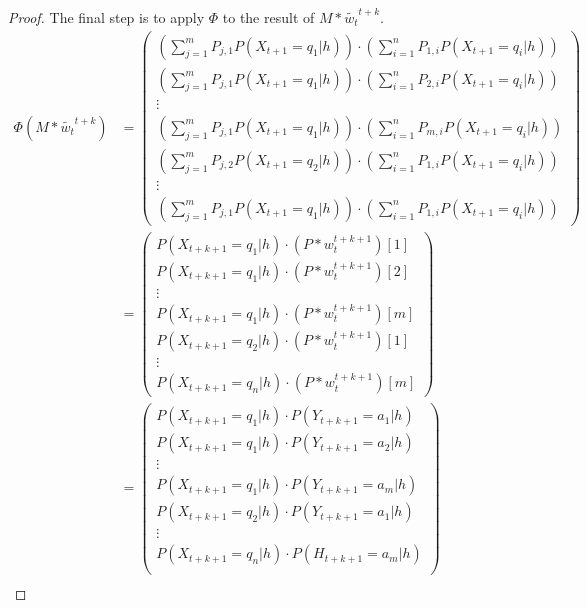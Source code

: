 \documentclass{article}
\theoremstyle{definition}
\begin{document}
\begin{proof}
The final step is to apply $\Phi$ to the result of $M*\widetilde{w_t}^{t+k}$. 
\begin{align*}
\Phi(M*\widetilde{w_t}^{t+k})&=\left ( \begin{matrix} 
\left (\sum\limits_{j=1}^m P_{j,1} P(X_{t+1}=q_1|h) \right )\cdot \left ( \sum\limits_{i=1}^{n} P_{1,i} P(X_{t+1}=q_i|h) \right ) \\
\left (\sum\limits_{j=1}^m P_{j,1} P(X_{t+1}=q_1|h) \right )\cdot \left ( \sum\limits_{i=1}^{n} P_{2,i} P(X_{t+1}=q_i|h) \right ) \\
\vdots \\
\left (\sum\limits_{j=1}^m P_{j,1} P(X_{t+1}=q_1|h) \right )\cdot \left ( \sum\limits_{i=1}^{n} P_{m,i} P(X_{t+1}=q_i|h) \right ) \\
\left (\sum\limits_{j=1}^m P_{j,2} P(X_{t+1}=q_2|h) \right )\cdot \left ( \sum\limits_{i=1}^{n} P_{1,i} P(X_{t+1}=q_i|h) \right ) \\
\vdots \\
\left (\sum\limits_{j=1}^m P_{j,1} P(X_{t+1}=q_1|h) \right )\cdot \left ( \sum\limits_{i=1}^{n} P_{1,i} P(X_{t+1}=q_i|h) \right )
\end{matrix}
\right ) \\
&=
\left ( 
\begin{matrix}
P(X_{t+k+1}=q_1|h)\cdot (P*w_t^{t+k+1})[1] \\
P(X_{t+k+1}=q_1|h)\cdot (P*w_t^{t+k+1})[2] \\
\vdots \\
P(X_{t+k+1}=q_1|h)\cdot (P*w_t^{t+k+1})[m] \\
P(X_{t+k+1}=q_2|h)\cdot (P*w_t^{t+k+1})[1] \\
\vdots \\
P(X_{t+k+1}=q_n|h)\cdot (P*w_t^{t+k+1})[m] 
\end{matrix}
\right )\\
&=
\left ( 
\begin{matrix}
P(X_{t+k+1}=q_1|h) \cdot P(Y_{t+k+1}=a_1|h) \\
P(X_{t+k+1}=q_1|h) \cdot P(Y_{t+k+1}=a_2|h) \\
\vdots \\
P(X_{t+k+1}=q_1|h) \cdot P(Y_{t+k+1}=a_m|h) \\
P(X_{t+k+1}=q_2|h) \cdot P(Y_{t+k+1}=a_1|h) \\
\vdots \\
P(X_{t+k+1}=q_n|h) \cdot P(H_{t+k+1}=a_m|h) \\
\end{matrix} 
\right ) \\

\end{align*}
\end{proof}
\end{document}
